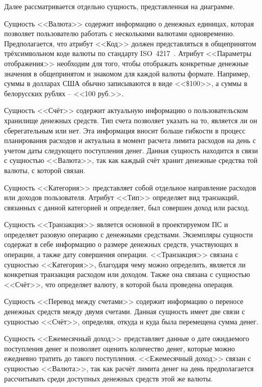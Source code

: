 Далее рассматривается отдельно сущность, представленная на диаграмме.

Сущность <<Валюта>> содержит информацию о денежных единицах, которая позволяет пользователю работать с несколькими валютами одновременно.
Предполагается, что атрибут <<Код>> должен представляться в общепринятом трёхсимвольном коде валюты по стандарту ISO~4217~\cite{iso_4217}.
Атрибут <<Параметры отображения>> необходим для того, чтобы отображать конкретные денежные значения в общепринятом и знакомом для каждой валюты формате. Например, суммы в долларах США обычно записываются в виде <<\$100>>, а суммы в белорусских рублях -- <<100 руб.>>.

Сущность <<Счёт>> содержит актуальную информацию о пользовательском хранилище денежных средств.
Тип счета позволяет указать на то, является ли он сберегательным или нет.
Эта информация вносит больше гибкости в процесс планирования расходов и актуальна в момент расчета лимита расходов на день с учетом даты следующего поступления денег.
Данная сущность находится в связи с сущностью <<Валюта>>, так как каждый счёт хранит денежные средства той валюты, с которой связан.

Сущность <<Категория>> представляет собой отдельное направление расходов или доходов пользователя.
Атрибут <<Тип>> определяет вид транзакций, связанных с данной категорией и определяет, был совершен доход или расход.

Сущность <<Транзакция>> является основной в проектируемом ПС и определяет разовую операцию с денежными средствами.
Экземпляры сущности содержат в себе информацию о размере денежных средств, участвующих в операции, а также дату совершения операции.
<<Транзакция>> связана с сущностью <<Категория>>, благодаря чему можно определить, является ли конкретная транзакция расходом или доходом.
Также она связана с сущностью <<Счёт>>, что определяет валюту, в которой была проведена операция.

Сущность <<Перевод между счетами>> содержит информацию о переносе денежных средств между двумя счетами.
Данная сущность имеет две связи с сущностью <<Счёт>>, определяя, откуда и куда была перемещена сумма денег.

Сущность <<Ежемесячный доход>> представляет данные о дате ожидаемого поступления денег и позволяет оценить количество денег, которые можно ежедневно тратить до такого поступления.
<<Ежемесячный доход>> связан с сущностью <<Валюта>>, так как расчёт лимита денег на день предполагается рассчитывать среди доступных денежных средств этой же валюты.

